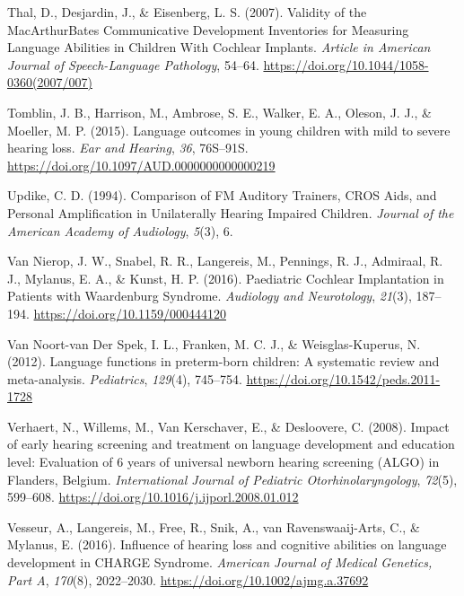 \documentclass[english,man]{apa6}
\begin{document}
\leavevmode\hypertarget{ref-thal2007}{}%
Thal, D., Desjardin, J., \& Eisenberg, L. S. (2007). Validity of the MacArthurBates Communicative Development Inventories for Measuring Language Abilities in Children With Cochlear Implants. \emph{Article in American Journal of Speech-Language Pathology}, 54--64. \url{https://doi.org/10.1044/1058-0360(2007/007)}

\leavevmode\hypertarget{ref-tomblin2015}{}%
Tomblin, J. B., Harrison, M., Ambrose, S. E., Walker, E. A., Oleson, J. J., \& Moeller, M. P. (2015). Language outcomes in young children with mild to severe hearing loss. \emph{Ear and Hearing}, \emph{36}, 76S--91S. \url{https://doi.org/10.1097/AUD.0000000000000219}

\leavevmode\hypertarget{ref-updike1994}{}%
Updike, C. D. (1994). Comparison of FM Auditory Trainers, CROS Aids, and Personal Amplification in Unilaterally Hearing Impaired Children. \emph{Journal of the American Academy of Audiology}, \emph{5}(3), 6.

\leavevmode\hypertarget{ref-vannierop2016}{}%
Van Nierop, J. W., Snabel, R. R., Langereis, M., Pennings, R. J., Admiraal, R. J., Mylanus, E. A., \& Kunst, H. P. (2016). Paediatric Cochlear Implantation in Patients with Waardenburg Syndrome. \emph{Audiology and Neurotology}, \emph{21}(3), 187--194. \url{https://doi.org/10.1159/000444120}

\leavevmode\hypertarget{ref-vannoort-vanderspek2012}{}%
Van Noort-van Der Spek, I. L., Franken, M. C. J., \& Weisglas-Kuperus, N. (2012). Language functions in preterm-born children: A systematic review and meta-analysis. \emph{Pediatrics}, \emph{129}(4), 745--754. \url{https://doi.org/10.1542/peds.2011-1728}

\leavevmode\hypertarget{ref-verhaert2008}{}%
Verhaert, N., Willems, M., Van Kerschaver, E., \& Desloovere, C. (2008). Impact of early hearing screening and treatment on language development and education level: Evaluation of 6 years of universal newborn hearing screening (ALGO) in Flanders, Belgium. \emph{International Journal of Pediatric Otorhinolaryngology}, \emph{72}(5), 599--608. \url{https://doi.org/10.1016/j.ijporl.2008.01.012}

\leavevmode\hypertarget{ref-vesseur2016}{}%
Vesseur, A., Langereis, M., Free, R., Snik, A., van Ravenswaaij-Arts, C., \& Mylanus, E. (2016). Influence of hearing loss and cognitive abilities on language development in CHARGE Syndrome. \emph{American Journal of Medical Genetics, Part A}, \emph{170}(8), 2022--2030. \url{https://doi.org/10.1002/ajmg.a.37692}
\end{document}
